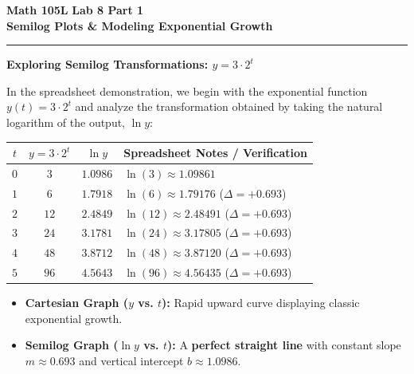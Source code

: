 \documentclass[10.5pt]{article}
\begin{document}
\noindent \textbf{\large Math 105L} \hfill \textbf{\large Lab 8 Part 1}\\[1pt]
{\textbf{\Large Semilog Plots \& Modeling Exponential Growth}}\\[-5pt]
\rule{\textwidth}{1.2pt}

\vspace{0.03in}

\textbf{\large Exploring Semilog Transformations: $y = 3 \cdot 2^t$}

In the spreadsheet demonstration, we begin with the exponential function $y(t) = 3 \cdot 2^t$ and analyze the transformation obtained by taking the natural logarithm of the output, $\ln y$:

\begin{center}
\renewcommand{\arraystretch}{1.25}
\begin{tabular}{|c|c|c|l|}
\hline
\textbf{$t$} & \textbf{$y = 3 \cdot 2^t$} & \textbf{$\ln y$} & \textbf{Spreadsheet Notes / Verification} \\ \hline
$0$ & $3$ & $1.0986$ & $\ln(3) \approx 1.09861$ \\ \hline
$1$ & $6$ & $1.7918$ & $\ln(6) \approx 1.79176$ ($\Delta = +0.693$) \\ \hline
$2$ & $12$ & $2.4849$ & $\ln(12) \approx 2.48491$ ($\Delta = +0.693$) \\ \hline
$3$ & $24$ & $3.1781$ & $\ln(24) \approx 3.17805$ ($\Delta = +0.693$) \\ \hline
$4$ & $48$ & $3.8712$ & $\ln(48) \approx 3.87120$ ($\Delta = +0.693$) \\ \hline
$5$ & $96$ & $4.5643$ & $\ln(96) \approx 4.56435$ ($\Delta = +0.693$) \\ \hline
\end{tabular}
\end{center}

\vspace{0.02in}

\begin{itemize}[leftmargin=1.2em, topsep=1pt, itemsep=2pt]
  \item \textbf{Cartesian Graph ($y$ vs. $t$):} Rapid upward curve displaying classic exponential growth.
  \item \textbf{Semilog Graph ($\ln y$ vs. $t$):} A \textbf{perfect straight line} with constant slope $m \approx 0.693$ and vertical intercept $b \approx 1.0986$.
\end{itemize}
\end{document}
